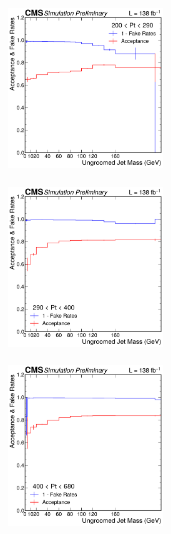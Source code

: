       \begin{figure}[htp!]
	\centering
	\begin{subfigure}
          \centering
          \includegraphics[width=0.45\textwidth]{figures/multijet/trijet/fakerates_ungroomed_0.pdf}
        \end{subfigure}%
        \begin{subfigure}
          \centering
          \includegraphics[width=0.45\textwidth]{figures/multijet/trijet/fakerates_ungroomed_1.pdf}
        \end{subfigure}%
        \begin{subfigure}
          \centering
          \includegraphics[width=0.45\textwidth]{figures/multijet/trijet/fakerates_ungroomed_2.pdf}
        \end{subfigure}%

\end{figure}
